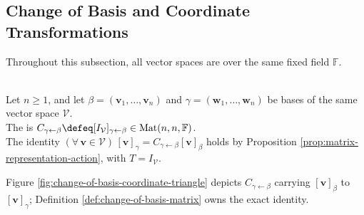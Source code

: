 \subsection{Change of Basis and Coordinate Transformations}
Throughout this subsection, all vector spaces are over the same fixed field $\mathbb{F}$.

\begin{definition} \label{def:change-of-basis-matrix} \\
Let $n\geq1$, and let $\beta=(\mathbf{v}_1,\ldots,\mathbf{v}_n)$ and $\gamma=(\mathbf{w}_1,\ldots,\mathbf{w}_n)$ be bases of the same vector space $\mathcal{V}$.\\
The  is $C_{\gamma\leftarrow\beta}\defeq[I_{\mathcal{V}}]_{\gamma\leftarrow\beta}\in\operatorname{Mat}(n,n,\mathbb{F})$.\\
The identity $(\forall\,\mathbf{v}\in\mathcal{V})\,[\mathbf{v}]_{\gamma}=C_{\gamma\leftarrow\beta}[\mathbf{v}]_{\beta}$ holds by Proposition \ref{prop:matrix-representation-action}, with $T=I_{\mathcal{V}}$.
\end{definition}

\begin{illustrationfigure}[H]
  \centering
  
  \caption{Direction of the coordinate rewrite implemented by $C_{\gamma\leftarrow\beta}$.}
  \label{fig:change-of-basis-coordinate-triangle}
\end{illustrationfigure}

Figure \ref{fig:change-of-basis-coordinate-triangle} depicts $C_{\gamma\leftarrow\beta}$ carrying $[\mathbf{v}]_{\beta}$ to $[\mathbf{v}]_{\gamma}$; Definition \ref{def:change-of-basis-matrix} owns the exact identity.


